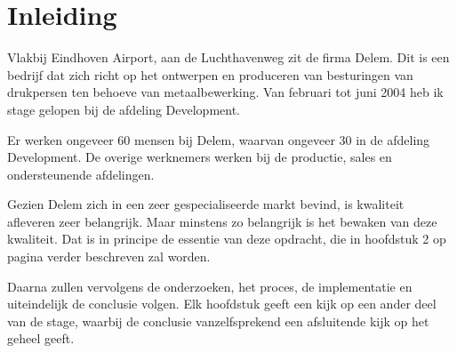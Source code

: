 \chapter{Inleiding}

Vlakbij Eindhoven Airport, aan de Luchthavenweg zit de firma Delem. Dit is een bedrijf dat zich richt op het ontwerpen en produceren van besturingen van drukpersen ten behoeve van metaalbewerking. Van februari tot juni 2004 heb ik stage gelopen bij de afdeling Development.

Er werken ongeveer 60 mensen bij Delem, waarvan ongeveer 30 in de afdeling Development. De overige werknemers werken bij de productie, sales en ondersteunende
afdelingen.

Gezien Delem zich in een zeer gespecialiseerde markt bevind, is kwaliteit afleveren zeer belangrijk. Maar minstens zo belangrijk is het bewaken van deze kwaliteit. Dat is in principe de essentie van deze opdracht, die in hoofdstuk 2 op pagina \pageref{opdracht} verder beschreven zal worden.

Daarna zullen vervolgens de onderzoeken, het proces, de implementatie en uiteindelijk de conclusie volgen. Elk hoofdstuk geeft een kijk op een ander deel van de stage, waarbij de conclusie vanzelfsprekend een afsluitende kijk op het geheel geeft.
